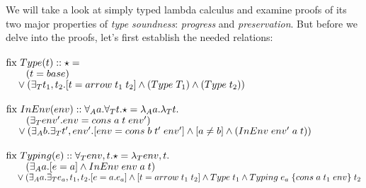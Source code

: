 \documentclass[english, mgr]{iithesis}
\begin{document}
We will take a look at simply typed lambda calculus and examine proofs of
its two major properties of \textit{type soundness}: \textit{progress} and \textit{preservation}.
But before we delve into the proofs, let's first establish the needed relations:
\\ \\
$\text{fix }Type(t)::\star=$ \\
${}\qquad (t = {base})$ \\
${}\quad \vee  (\exists_T t_1, t_2 .{[t = {arrow}\;t_1\;t_2]\wedge{({Type}\;T_1) \wedge ({Type}\;t_2) }})$ \\
\\
$\text{fix }InEnv(env)::\forall_A a .\forall_T t .\star= \lambda_A a . \lambda_T t . $\\
${}\qquad(\exists_T env' . {env = {cons}\;a\;t\;env'})$ \\
${}\quad\vee
  (\exists_A b .\exists_T t', env' .[env = {cons}\;b\;t'\;env']\wedge[a \neq b]\wedge({InEnv}\;env'\;a\;t) )$ \\
\\
$\text{fix }Typing(e)::\forall_T env, t .\star= \lambda_T env, t . $\\
${}\qquad(\exists_A a . {[e = a]\wedge {InEnv}}\;env\;a\;t)$ \\
${}\quad\vee (\exists_A a . \exists_T e_a, t_1, t_2 .[e = a.{e_a}]\wedge [t = {arrow}\;t_1\;t_2]\wedge {Type}\;t_1 \wedge {Typing}\;e_a\;\{{cons}\;a\;t_1\;env\}\;t_2$ \\
\end{document}
